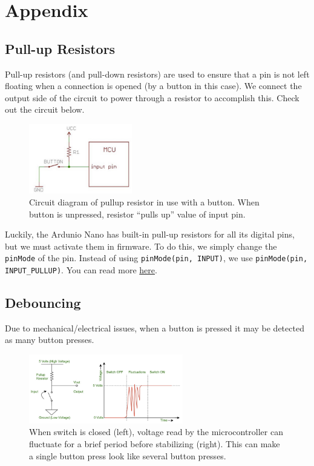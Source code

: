 \documentclass{article}
\begin{document}
\clearpage

\section{Appendix}

\subsection{Pull-up Resistors}

Pull-up resistors (and pull-down resistors) are used to ensure that a pin is not left floating when a connection is opened (by a button in this case). We connect the output side of the circuit to power through a resistor to accomplish this. Check out the circuit below. 

\begin{figure}[ht]
    \centering
    \includegraphics[width = 0.4\textwidth]{images/pullup.png}
    \cprotect\caption{Circuit diagram of pullup resistor in use with a button. When button is unpressed, resistor ``pulls up'' value of input pin. }
\end{figure}

Luckily, the Ardunio Nano has built-in pull-up resistors for all its digital pins, but we must activate them in firmware. To do this, we simply change the \verb|pinMode| of the pin. Instead of using \verb|pinMode(pin, INPUT)|, we use \verb|pinMode(pin, INPUT_PULLUP)|. You can read more \href{https://docs.arduino.cc/tutorials/generic/digital-input-pullup}{here}.

\subsection{Debouncing}

Due to mechanical/electrical issues, when a button is pressed it may be detected as many button presses.

\begin{figure}[ht]
    \centering
    \includegraphics[width = 0.6\textwidth]{images/debouncing.png}
    \cprotect\caption{When switch is closed (left), voltage read by the microcontroller can fluctuate for a brief period before stabilizing (right). This can make a single button press look like several button presses.}
\end{figure}
\end{document}
